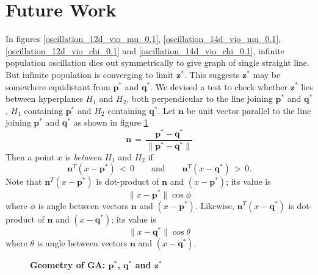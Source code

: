 \section{Future Work}
In figures \ref{oscillation_12d_vio_mu_0.1}, \ref{oscillation_14d_vio_mu_0.1}, 
\ref{oscillation_12d_vio_chi_0.1} and \ref{oscillation_14d_vio_chi_0.1},  
infinite population oscillation dies out symmetrically to 
give graph of single straight line. But infinite population is converging to limit $\bm{z}^\ast$. 
This suggests $\bm{z}^\ast$ may be somewhere equidistant from $\bm{p}^\ast$ and $\bm{q}^\ast$.
We devised a test to check whether $\bm{z}^\ast$ lies between hyperplanes $H_1$ and $H_2$, both perpendicular to the line 
joining $\bm{p}^\ast$ and $\bm{q}^\ast$, $H_1$ containing $\bm{p}^\ast$ and $H_2$ containing $\bm{q}^\ast$.
Let $\bm{n}$ be unit vector parallel to the line joining $\bm{p}^\ast$ and $\bm{q}^\ast$ as shown in figure \ref{pqz}
\[
  \bm{n} \,=\, \frac{\bm{p}^\ast - \bm{q}^\ast}{\|\bm{p}^\ast-\bm{q}^\ast\|}
\]
Then a point $x$ is {\em between} $H_1$ and $H_2$ if
\[
  \bm{n}^T(x-\bm{p}^\ast) \,<\, 0 \quad \quad \text{and} \quad \quad \bm{n}^T(x-\bm{q}^\ast) \,>\, 0.
\]
Note that $\bm{n}^T(x-\bm{p}^\ast)$ is dot-product of $\bm{n}$ and $(x-\bm{p}^\ast)$; its value is 
\[
  \|x-\bm{p}^\ast\| \cos \phi
\]
where $\phi$ is angle between vectors $\bm{n}$ and $(x-\bm{p}^\ast)$. Likewise, 
$\bm{n}^T(x-\bm{q}^\ast)$ is dot-product of $\bm{n}$ and $(x-\bm{q}^\ast)$; its value is
\[
  \|x-\bm{q}^\ast\| \cos \theta
\]
where $\theta$ is angle between vectors $\bm{n}$ and $(x-\bm{q}^\ast)$.

\begin{figure}[!ht]
\begin{center}
\hspace{-3em}%
\caption[\textbf{Geometry of GA:  $\bm{p}^\ast$, $\bm{q}^\ast$ and $\bm{z}^\ast$}]
{\textbf{Geometry of GA:  $\bm{p}^\ast$, $\bm{q}^\ast$ and $\bm{z}^\ast$}}
\label{pqz}
\end{center}
\end{figure}

